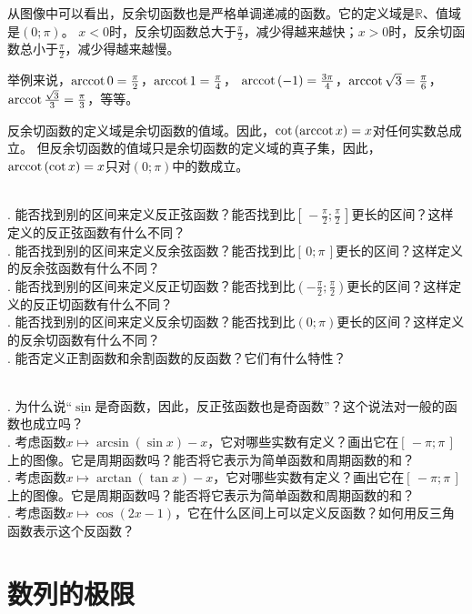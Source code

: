 \documentclass[12pt,UTF8,fontset=none]{ctexbook}
\begin{document}
从图像中可以看出，反余切函数也是严格单调递减的函数。它的定义域是$\mathbb{R}$、值域是$(0; \pi)$。
$x < 0$时，反余切函数总大于$\frac{\pi}{2}$，减少得越来越快；$x > 0$时，反余切函数总小于$\frac{\pi}{2}$，减少得越来越慢。

举例来说，$\operatorname{arccot}{0} = \frac{\pi}{2}$，$\operatorname{arccot}{1} = \frac{\pi}{4}$，
$\operatorname{arccot}{(-1)} = \frac{3\pi}{4}$，$\operatorname{arccot}{\sqrt{3}} = \frac{\pi}{6}$，$\operatorname{arccot}{\frac{\sqrt{3}}{3}} = \frac{\pi}{3}$，等等。

反余切函数的定义域是余切函数的值域。因此，$\cot{(\operatorname{arccot}{x})} = x$对任何实数总成立。
但反余切函数的值域只是余切函数的定义域的真子集，因此，$\operatorname{arccot}{(\cot{x})} = x$只对$(0; \pi)$中的数成立。

\begin{sk}
    \mbox{} \\
    . 能否找到别的区间来定义反正弦函数？能否找到比$[\,-\frac{\pi}{2};\frac{\pi}{2}\,]$更长的区间？这样定义的反正弦函数有什么不同？\\
    . 能否找到别的区间来定义反余弦函数？能否找到比$[\,0; \pi\,]$更长的区间？这样定义的反余弦函数有什么不同？\\
    . 能否找到别的区间来定义反正切函数？能否找到比$(-\frac{\pi}{2};\frac{\pi}{2})$更长的区间？这样定义的反正切函数有什么不同？\\
    . 能否找到别的区间来定义反余切函数？能否找到比$(0;\pi)$更长的区间？这样定义的反余切函数有什么不同？\\
    . 能否定义正割函数和余割函数的反函数？它们有什么特性？
\end{sk}
\begin{xt}
    \mbox{} \\
    . 为什么说“$\underline{\sin}$是奇函数，因此，反正弦函数也是奇函数”？这个说法对一般的函数也成立吗？\\
    . 考虑函数$x\mapsto \arcsin{(\sin{x})} - x$，它对哪些实数有定义？画出它在$[\,-\pi; \pi\,]$上的图像。它是周期函数吗？能否将它表示为简单函数和周期函数的和？\\
    . 考虑函数$x\mapsto \arctan{(\tan{x})} - x$，它对哪些实数有定义？画出它在$[\,-\pi; \pi\,]$上的图像。它是周期函数吗？能否将它表示为简单函数和周期函数的和？\\
    . 考虑函数$x\mapsto \cos(2x - 1)$，它在什么区间上可以定义反函数？如何用反三角函数表示这个反函数？
\end{xt}

\chapter{数列的极限}
\end{document}
